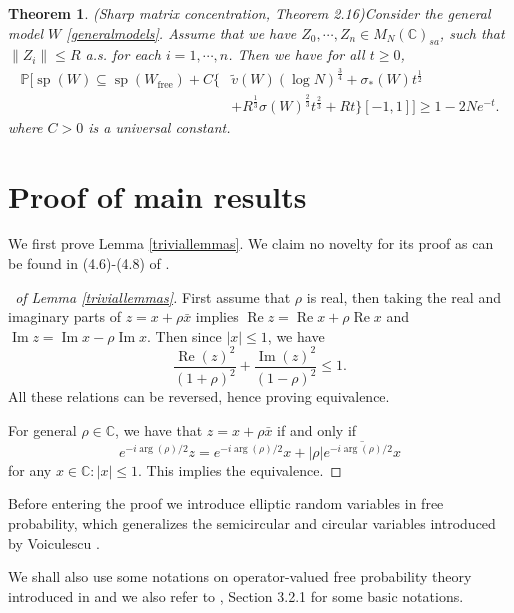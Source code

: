 \documentclass[11pt,reqno]{amsart}
\theoremstyle{plain}
\newtheorem{theorem}{Theorem}[section]
\theoremstyle{remark}
\numberwithin{equation}{section}
\begin{document}
\begin{theorem}(Sharp matrix concentration, \cite{brailovskaya2022universality} Theorem 2.16)\label{theorem2.61} Consider the general model $W$ \eqref{generalmodels}. Assume that we have $Z_0,\cdots,Z_n\in M_N(\mathbb{C})_{sa}$, such that $\|Z_i\|\leq R$ a.s. for each $i=1,\cdots,n$. Then we have for all $t\geq 0$, 
       $$\begin{aligned}
\mathbb{P}\Big[ \operatorname{sp}(W)\subseteq \operatorname{sp}(W_{\text{free}})+C\big\{&\widetilde v(W)(\log N)^{\frac{3}{4}}+\sigma_*(W)t^{\frac{1}{2}}\\
&+R^\frac{1}{3}\sigma(W)^{\frac{2}{3}}t^\frac{2}{3}+Rt\big\}[-1,1]\Big]\geq 1-2Ne^{-t}.
    \end{aligned}$$
    where $C>0$ is a universal constant.
\end{theorem}



\section{Proof of main results}

\label{proofofmainresults}
We first prove Lemma \ref{triviallemmas}. We claim no novelty for its proof as can be found in (4.6)-(4.8) of \cite{alt2022local}.

\begin{proof}[\proofname\ of Lemma \ref{triviallemmas}]  First assume that $\rho$ is real, then taking the real and imaginary parts of $z=x+\rho\bar{
x}$ implies $\operatorname{Re}z=\operatorname{Re}x+\rho\operatorname{Re}x$ and $\operatorname{Im}z=\operatorname{Im}x-\rho\operatorname{Im}x$. Then since $|x|\leq 1$, we have $$\frac{\operatorname{Re}(z)^2}{(1+\rho)^2}+\frac{\operatorname{Im}(z)^2}{(1-\rho)^2}\leq 1.$$ All these relations can be reversed, hence proving equivalence.

For general $\rho\in\mathbb{C}$, we have that $z=x+\rho\bar{x}$ if and only if $$e^{-i\arg(\rho)/2}z=e^{-i\arg(\rho)/2}x+|\rho|\overline{e^{-i\operatorname{arg}(\rho)/2}x}$$ for any $x\in\mathbb{C}:|x|\leq 1$. This implies the equivalence.    
\end{proof}


Before entering the proof we introduce elliptic random variables in free probability, which generalizes the semicircular and circular variables introduced by Voiculescu \cite{voiculescu1991limit}.

We shall also use some notations on operator-valued free probability theory introduced in \cite{voiculescu1995operations} and we also refer to \cite{belinschi2021outlier}, Section 3.2.1 for some basic notations. 
\end{document}
